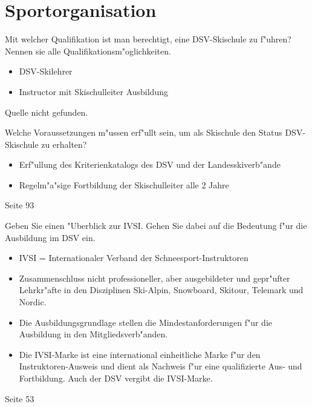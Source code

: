 \section{Sportorganisation}

\begin{question}{1}
Mit welcher Qualifikation ist man berechtigt, eine DSV-Skischule zu f"uhren? Nennen sie alle Qualifikationsm"oglichkeiten.
\end{question}
\begin{solution}
\begin{itemize}
\item DSV-Skilehrer
\item Instructor mit Skischulleiter Ausbildung
\end{itemize}
Quelle nicht gefunden.
\end{solution}

\begin{question}{2}
Welche Voraussetzungen m"ussen erf"ullt sein, um als Skischule den Status DSV-Skischule zu erhalten?
\end{question}
\begin{solution}
\begin{itemize}
\item Erf"ullung des Kriterienkatalogs des DSV und der Landesskiverb"ande
\item Regelm"a"sige Fortbildung der Skischulleiter alle 2 Jahre
\end{itemize}
 Seite 93
\end{solution}

\begin{question}{5}
Geben Sie einen "Uberblick zur IVSI. Gehen Sie dabei auf die Bedeutung f"ur die Ausbildung im DSV ein.
\end{question}
\begin{solution}
\begin{itemize}
\item IVSI = Internationaler Verband der Schneesport-Instruktoren
\item Zusammenschluss nicht professioneller, aber ausgebildeter und gepr"ufter Lehrkr"afte in den Disziplinen Ski-Alpin, Snowboard, Skitour, Telemark und Nordic.
\item Die Ausbildungsgrundlage stellen die Mindestanforderungen f"ur die Ausbildung in den Mitgliedsverb"anden.
\item Die IVSI-Marke ist eine international einheitliche Marke f"ur den Instruktoren-Ausweis und dient als Nachweis f"ur eine qualifizierte Aus- und Fortbildung. Auch der DSV vergibt die IVSI-Marke.
\end{itemize}
 Seite 53
\end{solution}

